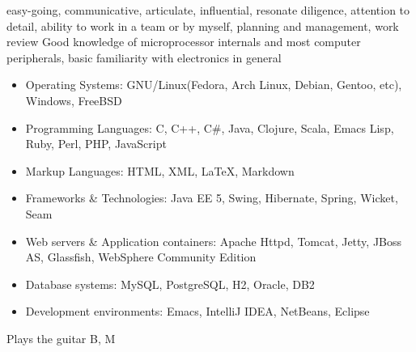 \ecvlanguageheader{(*)}
\ecvlanguagefooter{(*)}
\ecvitem{}{}
\ecvitem{}{}
{
  easy-going, communicative, articulate, influential, resonate  
}
{
  diligence, attention to detail, ability to work in a team or by
  myself, planning and management, work review
}
{
  Good knowledge of microprocessor internals and most computer
  peripherals, basic familiarity with electronics in general
}
{
  \begin{itemize}
  \item Operating Systems: GNU/Linux(Fedora, Arch Linux, Debian,
    Gentoo, etc), Windows, FreeBSD
  \item Programming Languages: C, C++, C\#, Java, Clojure, Scala,
    Emacs Lisp, Ruby, Perl, PHP, JavaScript
  \item Markup Languages: HTML, XML, \LaTeX, Markdown
  \item Frameworks \& Technologies: Java EE 5, Swing, Hibernate,
    Spring, Wicket, Seam
  \item Web servers \& Application containers: Apache Httpd, Tomcat,
    Jetty, JBoss AS, Glassfish, WebSphere Community Edition
  \item Database systems: MySQL, PostgreSQL, H2, Oracle, DB2
  \item Development environments: Emacs, IntelliJ IDEA, NetBeans, Eclipse 
  \end{itemize}
}
{
  Plays the guitar
}
{}
{B, M}

\ecvitem{}{}
\ecvitem{}{}

